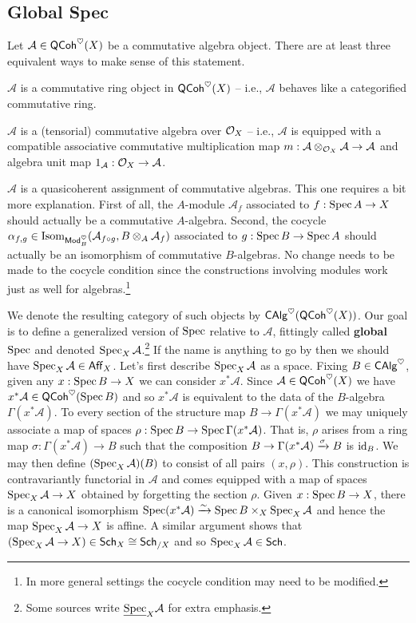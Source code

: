 \documentclass[11pt]{article}
\renewcommand{\AA}{\mathcal{A}}
\begin{document}
\subsection{Global Spec}
Let $\AA\in\QCoh^{\heart}(X)$ be a commutative algebra object. There are at least three equivalent ways to make sense of this statement.
\begin{enum}{\roman}
\item $\AA$ is a commutative ring object in $\operatorname{\mathsf{QCoh}}^{\heartsuit}(X)$ -- i.e., $\AA$ behaves like a categorified commutative ring.

\item $\AA$ is a (tensorial) commutative algebra over $\mathcal{O}_X$ -- i.e., $\AA$ is equipped with a compatible associative commutative multiplication map $m: \AA\tensor_{\O_X}\AA\to\AA$ and algebra unit map $1_{\AA}: \O_X\to\AA$.

\item $\AA$ is a quasicoherent assignment of commutative algebras. This one requires a bit more explanation. First of all, the $A$-module $\AA_f$ associated to $f: \operatorname{Spec} A\to X$ should actually be a commutative $A$-algebra. Second, the cocycle $\alpha_{f,g}\in\Isom_{\Mod_B^{\heart}}(\AA_{f\circ g},B\tensor_A\AA_f)$ associated to $g: \operatorname{Spec} B\to\operatorname{Spec} A$ should actually be an isomorphism of commutative $B$-algebras. No change needs to be made to the cocycle condition since the constructions involving modules work just as well for algebras.\footnote{In more general settings the cocycle condition may need to be modified.}  
\end{enum}
We denote the resulting category of such objects by $\operatorname{\mathsf{CAlg}}^{\heartsuit}(\operatorname{\mathsf{QCoh}}^{\heartsuit}(X))$. Our goal is to define a generalized version of $\operatorname{Spec}$ relative to $\AA$, fittingly called \textbf{global $\operatorname{Spec}$} and denoted $\Spec_X\AA$.\footnote{Some sources write $\un{\Spec}_X\AA$ for extra emphasis.} If the name is anything to go by then we should have $\Spec_X\AA\in\Aff_X$. Let's first describe $\Spec_X\AA$ as a space. Fixing $B\in\operatorname{\mathsf{CAlg}}^{\heartsuit}$, given any $x: \operatorname{Spec} B\to X$ we can consider $x^*\AA$. Since $\AA\in\QCoh^{\heart}(X)$ we have $x^*\AA\in\QCoh^{\heart}(\Spec B)$ and so $x^*\AA$ is equivalent to the data of the $B$-algebra $\Gamma(x^*\AA)$. To every section of the structure map $B\to\Gamma(x^*\AA)$ we may uniquely associate a map of spaces $\rho: \Spec B\to\Spec\Gamma(x^*\AA)$. That is, $\rho$ arises from a ring map $\sigma: \Gamma(x^*\AA)\to B$ such that the composition $B\to\Gamma(x^*\AA)\xto{\sigma}B$ is $\operatorname{id}_B$. We may then define $(\Spec_X\AA)(B)$ to consist of all pairs $(x,\rho)$. This construction is contravariantly functorial in $\AA$ and comes equipped with a map of spaces $\Spec_X\AA\to X$ obtained by forgetting the section $\rho$. Given $x: \operatorname{Spec} B\to X$, there is a canonical isomorphism $\Spec(x^*\AA)\xto{\sim}\Spec B\times_X\Spec_X\AA$ and hence the map $\Spec_X\AA\to X$ is affine. A similar argument shows that $(\Spec_X\AA\to X)\in\Sch_X\iso\Sch_{/X}$ and so $\Spec_X\AA\in\Sch$.
\end{document}
